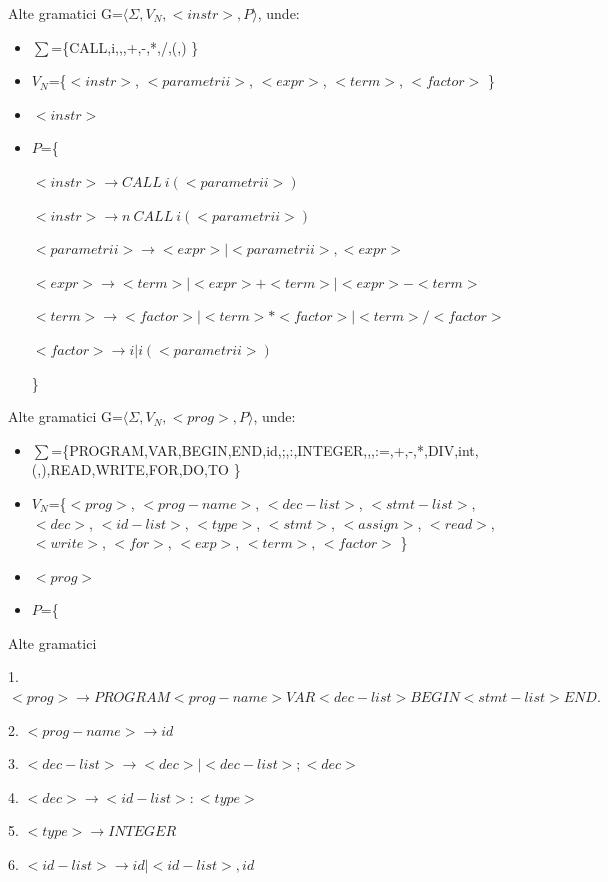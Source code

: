 \documentclass[pdf]{beamer}
\begin{document}
\begin{frame}{Alte gramatici}
G=$\langle \Sigma, V_N, <instr>, P \rangle$, unde:

\begin{itemize}
\item
$\sum$=\{CALL,i,,,+,-,*,/,(,) \}
\item
$V_N$=\{$<instr>$, $<parametrii>$, $<expr>$, $<term>$, $<factor>$ \}
\item
$<instr>$
\item
$P$=\{

$<instr> \rightarrow CALL \ i (<parametrii>)$

$<instr> \rightarrow n \ CALL \ i (<parametrii>)$

$<parametrii> \rightarrow <expr> | <parametrii>, <expr>$

$<expr> \rightarrow <term> | <expr>+<term> | <expr>-<term>$

$<term> \rightarrow <factor> | <term>*<factor> | <term>/<factor>$ 

$<factor> \rightarrow i | i(<parametrii>)$ 

\}
\end{itemize}

\end{frame}



\begin{frame}{Alte gramatici}
G=$\langle \Sigma, V_N, <prog>, P \rangle$, unde:

\begin{itemize}
\item
$\sum$=\{PROGRAM,VAR,BEGIN,END,id,;,:,INTEGER,,,:=,+,-,*,DIV,int,(,),READ,WRITE,FOR,DO,TO \}
\item
$V_N$=\{$<prog>$, $<prog-name>$, $<dec-list>$, $<stmt-list>$, $<dec>$, $<id-list>$, $<type>$, $<stmt>$, $<assign>$, $<read>$, $<write>$, $<for>$, $<exp>$, $<term>$, $<factor>$ \}
\item
$<prog>$
\item
$P$=\{

\end{itemize}

\end{frame}



\begin{frame}{Alte gramatici}

1. $<prog> \rightarrow PROGRAM <prog-name> VAR <dec-list> BEGIN <stmt-list> END. $

2. $<prog-name> \rightarrow id$ 

3. $<dec-list> \rightarrow <dec> | <dec-list> ; <dec> $

4. $<dec> \rightarrow <id-list> : <type> $

5. $<type> \rightarrow INTEGER $

6. $<id-list> \rightarrow id | <id-list> , id $

\end{frame}
\end{document}
